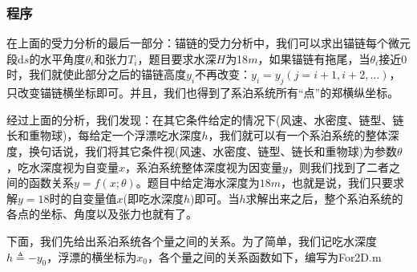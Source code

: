 \documentclass[UTF8]{ctexbook}
\theoremstyle{nonumberplain}
\begin{document}
        \subsubsection{程序}
            \par
            在上面的受力分析的最后一部分：锚链的受力分析中，我们可以求出锚链每个微元段$\mathrm{d}s$的水平角度$\theta_i$和张力$T_i$，题目要求水深$H$为18$m$，如果锚链有拖尾，当$\theta_i$接近0时，我们就使此部分之后的锚链高度$y_i$不再改变：$y_i = y_{j}(j = i+1,i+2,\dots)$，只改变锚链横坐标即可。并且，我们也得到了系泊系统所有“点”的郑横纵坐标。
            \par
            经过上面的分析，我们发现：在其它条件给定的情况下(风速、水密度、链型、链长和重物球)，每给定一个浮漂吃水深度$h$，我们就可以有一个系泊系统的整体深度，换句话说，我们将其它条件视(风速、水密度、链型、链长和重物球)为参数$\theta$，吃水深度视为自变量$x$，系泊系统整体深度视为因变量$y$，则我们找到了二者之间的函数关系$y = f(x;\theta)$。题目中给定海水深度为$18m$，也就是说，我们只要求解$y=18$时的自变量值$x$(即吃水深度$h$)即可。当$h$求解出来之后，整个系泊系统的各点的坐标、角度以及张力也就有了。
            \par
            下面，我们先给出系泊系统各个量之间的关系。为了简单，我们记吃水深度$h\triangleq  -y_0$，浮漂的横坐标为$x_0$，各个量之间的关系函数如下，编写为For2D.m
\end{document}
